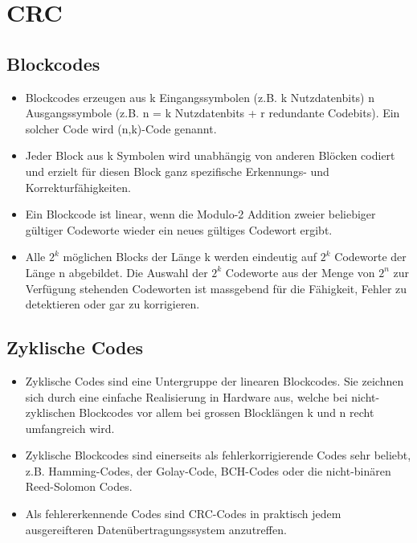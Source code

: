 \section{CRC}
\subsection{Blockcodes}
\begin{itemize}
	\item	Blockcodes erzeugen aus k Eingangssymbolen (z.B. k Nutzdatenbits) n Ausgangssymbole (z.B. n = k Nutzdatenbits + r redundante Codebits). Ein solcher Code wird (n,k)-Code genannt.
	\item Jeder Block aus k Symbolen wird unabhängig von anderen Blöcken codiert und erzielt für diesen Block ganz spezifische Erkennungs- und Korrekturfähigkeiten.
	\item Ein Blockcode ist linear, wenn die Modulo-2 Addition zweier beliebiger gültiger Codeworte wieder ein neues gültiges Codewort ergibt.
	\item Alle $2^k$ möglichen Blocks der Länge k werden eindeutig auf $2^k$ Codeworte der Länge n abgebildet. Die Auswahl der $2^k$ Codeworte aus der Menge von $2^n$ zur Verfügung stehenden Codeworten ist massgebend für die Fähigkeit, Fehler zu detektieren oder gar zu korrigieren.
\end{itemize}

\subsection{Zyklische Codes}
\begin{itemize}
	\item Zyklische Codes sind eine Untergruppe der linearen Blockcodes. Sie zeichnen sich durch eine einfache Realisierung in Hardware aus, welche bei nicht-zyklischen Blockcodes vor allem bei grossen Blocklängen k und n recht umfangreich wird.
	\item Zyklische Blockcodes sind einerseits als fehlerkorrigierende Codes sehr beliebt, z.B. Hamming-Codes, der Golay-Code, BCH-Codes oder die nicht-binären Reed-Solomon Codes.
	\item Als fehlererkennende Codes sind CRC-Codes in praktisch jedem ausgereifteren Datenübertragungssystem anzutreffen.
\end{itemize}

